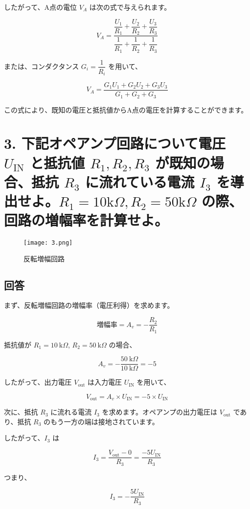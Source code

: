 \documentclass{article}
\begin{document}
したがって、A点の電位 \(V_A\) は次の式で与えられます。

\[
V_A = \frac{\dfrac{U_1}{R_1} + \dfrac{U_2}{R_2} + \dfrac{U_3}{R_3}}{\dfrac{1}{R_1} + \dfrac{1}{R_2} + \dfrac{1}{R_3}}
\]

または、コンダクタンス \(G_i = \dfrac{1}{R_i}\) を用いて、

\[
V_A = \frac{G_1 U_1 + G_2 U_2 + G_3 U_3}{G_1 + G_2 + G_3}
\]

この式により、既知の電圧と抵抗値からA点の電圧を計算することができます。

\newpage  %

\section*{3. 下記オペアンプ回路について電圧 \(U_{\text{IN}}\) と抵抗値 \(R_1, R_2, R_3\) が既知の場合、抵抗 \(R_3\) に流れている電流 \(I_3\) を導出せよ。\(R_1=10\text{k}\Omega, R_2=50\text{k}\Omega\) の際、回路の増幅率を計算せよ。}
\begin{figure}[H]
    \centering
    \texttt{[image: 3.png]}
    \caption{反転増幅回路}
\end{figure}

\subsection*{回答}

まず、反転増幅回路の増幅率（電圧利得）を求めます。

\[
\text{増幅率} = A_v = -\frac{R_2}{R_1}
\]

抵抗値が \(R_1 = 10\ \text{k}\Omega\), \(R_2 = 50\ \text{k}\Omega\) の場合、

\[
A_v = -\frac{50\ \text{k}\Omega}{10\ \text{k}\Omega} = -5
\]

したがって、出力電圧 \(V_{\text{out}}\) は入力電圧 \(U_{\text{IN}}\) を用いて、

\[
V_{\text{out}} = A_v \times U_{\text{IN}} = -5 \times U_{\text{IN}}
\]

次に、抵抗 \(R_3\) に流れる電流 \(I_3\) を求めます。オペアンプの出力電圧は \(V_{\text{out}}\) であり、抵抗 \(R_3\) のもう一方の端は接地されています。

したがって、\(I_3\) は

\[
I_3 = \frac{V_{\text{out}} - 0}{R_3} = \frac{-5 U_{\text{IN}}}{R_3}
\]

つまり、

\[
I_3 = -\frac{5 U_{\text{IN}}}{R_3}
\]
\end{document}
